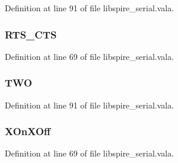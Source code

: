 Definition at line 91 of file libspire\-\_\-serial.\-vala.

\hypertarget{libspire__serial_8vala_a3d3371956fb29f3a84cdf916d8f347f6}{
\subsubsection[{R\-T\-S\-\_\-\-C\-T\-S}]{\setlength{\rightskip}{0pt plus 5cm}R\-T\-S\-\_\-\-C\-T\-S}}\label{libspire__serial_8vala_a3d3371956fb29f3a84cdf916d8f347f6}


Definition at line 69 of file libspire\-\_\-serial.\-vala.

\hypertarget{libspire__serial_8vala_a0673b633b0851b14ed38bd96f5781290}{
\subsubsection[{T\-W\-O}]{\setlength{\rightskip}{0pt plus 5cm}T\-W\-O}}\label{libspire__serial_8vala_a0673b633b0851b14ed38bd96f5781290}


Definition at line 91 of file libspire\-\_\-serial.\-vala.

\hypertarget{libspire__serial_8vala_aaa5982881590a50cb505f83a83e4b0f6}{
\subsubsection[{X\-On\-X\-Off}]{\setlength{\rightskip}{0pt plus 5cm}X\-On\-X\-Off}}\label{libspire__serial_8vala_aaa5982881590a50cb505f83a83e4b0f6}


Definition at line 69 of file libspire\-\_\-serial.\-vala.

